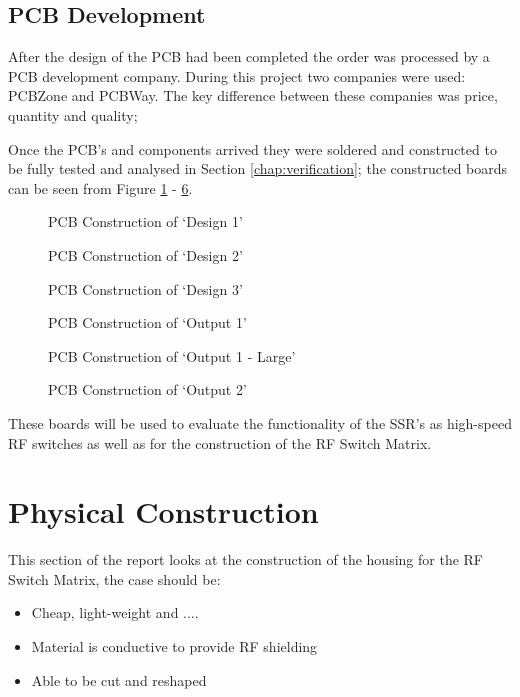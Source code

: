 \documentclass[12pt,openany,a4paper]{book}
\begin{document}
\subsection{PCB Development}
After the design of the PCB had been completed the order was processed by a PCB development company. During this project two companies were used: PCBZone and PCBWay. The key difference between these companies was price, quantity and quality; 

Once the PCB's and components arrived they were soldered and constructed to be fully tested and analysed in Section \ref{chap:verification}; the constructed boards can be seen from Figure \ref{fig:act:design1} - \ref{fig:act:output2}.
\begin{figure}[H]
	\centering
	\caption{PCB Construction of `Design 1'}
	\label{fig:act:design1}
\end{figure} 
\begin{figure}[H]
	\centering
	\caption{PCB Construction of `Design 2'}
	\label{fig:act:design2}
\end{figure} 
\begin{figure}[H]
	\centering
	\caption{PCB Construction of `Design 3'}
	\label{fig:act:design3}
\end{figure} 
\begin{figure}[H]
	\centering
	\caption{PCB Construction of `Output 1'}
	\label{fig:act:output1}
\end{figure} 
\begin{figure}[H]
	\centering
	\caption{PCB Construction of `Output 1 - Large'}
	\label{fig:act:output1}
\end{figure} 
\begin{figure}[H]
	\centering
	\caption{PCB Construction of `Output 2'}
	\label{fig:act:output2}
\end{figure} 
These boards will be used to evaluate the functionality of the SSR's as high-speed RF switches as well as for the construction of the RF Switch Matrix.




\section{Physical Construction}
This section of the report looks at the construction of the housing for the RF Switch Matrix, the case should be:
\vspace{-0.3cm}
\begin{itemize}
	\setlength\itemsep{-0.5em}
	\item Cheap, light-weight and ....
	\item Material is conductive to provide RF shielding
	\item Able to be cut and reshaped
\end{itemize}
\end{document}
